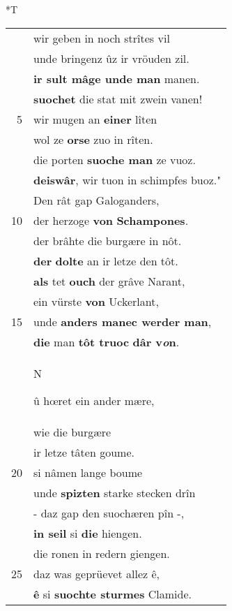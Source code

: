 \documentclass[8pt,a4paper,notitlepage]{article}
\begin{document}
\begin{table}[ht]
\begin{minipage}[t]{0.5\linewidth}
\end{minipage}
\hspace{0.5cm}
\begin{minipage}[t]{0.5\linewidth}
\small
\begin{center}*T
\end{center}
\begin{tabular}{rl}
 & wir geben in noch strîtes vil\\ 
 & unde bringenz ûz ir vröuden zil.\\ 
 & \textbf{ir sult mâge unde man} manen.\\ 
 & \textbf{suochet} die stat mit zwein vanen!\\ 
5 & wir mugen an \textbf{einer} lîten\\ 
 & wol ze \textbf{orse} zuo in rîten.\\ 
 & die porten \textbf{suoche man} ze vuoz.\\ 
 & \textbf{deiswâr}, wir tuon in schimpfes buoz."\\ 
 & Den rât gap Galoganders,\\ 
10 & der herzoge \textbf{von} \textbf{Schampones}.\\ 
 & der brâhte die burgære in nôt.\\ 
 & \textbf{der} \textbf{dolte} an ir letze den tôt.\\ 
 & \textbf{als} tet \textbf{ouch} der grâve Narant,\\ 
 & ein vürste \textbf{von} Uckerlant,\\ 
15 & unde \textbf{anders manec werder man},\\ 
 & \textbf{die} man \textbf{tôt truoc} \textbf{dâr v\textit{o}n}.\\ 
 & \begin{large}N\end{large}û hœret ein ander mære,\\ 
 & wie die burgære\\ 
 & ir letze tâten goume.\\ 
20 & si nâmen lange boume\\ 
 & unde \textbf{spizten} starke stecken drîn\\ 
 & - daz gap den suochæren pîn -,\\ 
 & \textbf{in seil} si \textbf{die} hiengen.\\ 
 & die ronen in redern giengen.\\ 
25 & daz was geprüevet allez ê,\\ 
 & \textbf{ê} si \textbf{suochte sturmes} Clamide.\\ 

\end{tabular}
\end{minipage}
\end{table}
\end{document}
